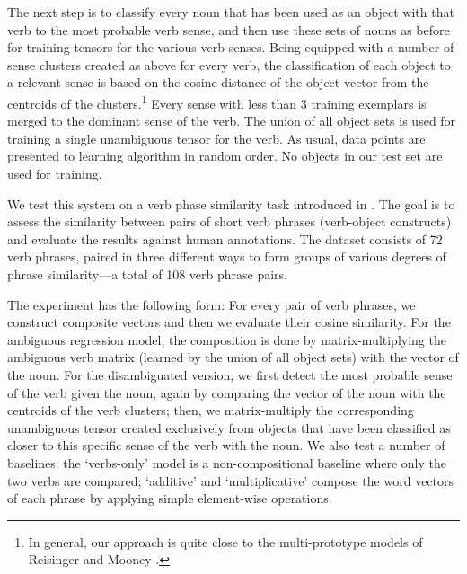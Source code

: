 \documentclass[11pt]{article}
\begin{document}
The next step is to classify every noun that has been used as an object with that verb to the most probable verb sense, and then use these sets of nouns as before for training tensors for the various verb senses. Being equipped with a number of sense clusters created as above for every verb, the classification of each object to a relevant sense is based on the cosine distance of the object vector from the centroids of the clusters.\footnote{In general, our approach is quite close to the multi-prototype models of Reisinger and Mooney .} Every sense with less than 3 training exemplars is merged to the dominant sense of the verb. The union of all object sets is used for training a single unambiguous tensor for the verb. As usual, data points are presented to learning algorithm in random order. No objects in our test set are used for training.

We test this system on a verb phase similarity task introduced in \cite{lapata2010}. The goal is to assess the similarity between pairs of short verb phrases (verb-object constructs) and evaluate the results against human annotations. The dataset consists of 72 verb phrases, paired in three different ways to form groups of various degrees of phrase similarity---a total of 108 verb phrase pairs.

The experiment has the following form: For every pair of verb phrases, we construct composite vectors and then we evaluate their cosine similarity. For the ambiguous regression model, the composition is done by matrix-multiplying the ambiguous verb matrix (learned by the union of all object sets) with the vector of the noun. For the disambiguated version, we first detect the most probable sense of the verb given the noun, again by comparing the vector of the noun with the centroids of the verb clusters; then, we matrix-multiply the corresponding unambiguous tensor created exclusively from objects that have been classified as closer to this specific sense of the verb with the noun. We also test a number of baselines: the `verbs-only' model is a non-compositional baseline where only the two verbs are compared; `additive' and `multiplicative' compose the word vectors of each phrase by applying simple element-wise operations.
\end{document}

